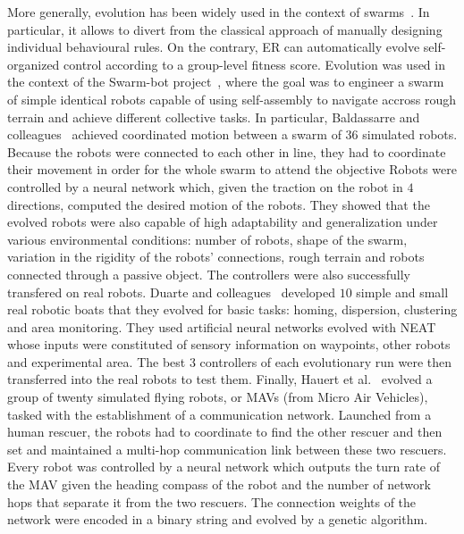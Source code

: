     More generally, evolution has been widely used in the context of swarms~\parencite{Brambilla2012, Fancesca2016}. In particular, it allows to divert from the classical approach of manually designing individual behavioural rules. On the contrary, ER can automatically evolve self-organized control according to a group-level fitness score. Evolution was used in the context of the Swarm-bot project~\parencite{Mondada2005}, where the goal was to engineer a swarm of simple identical robots capable of using self-assembly to navigate accross rough terrain and achieve different collective tasks. In particular, Baldassarre and colleagues~\parencite{Baldassarre2007} achieved coordinated motion  between a swarm of $36$ simulated robots. Because the robots were connected to each other in line, they had to coordinate their movement in order for the whole swarm to attend the objective Robots were controlled by a neural network which, given the traction on the robot in $4$ directions, computed the desired motion of the robots. They showed that the evolved robots were also capable of high adaptability and generalization under various environmental conditions: number of robots, shape of the swarm, variation in the rigidity of the robots' connections, rough terrain and robots connected through a passive object. The controllers were also successfully transfered on real robots. Duarte and colleagues~\parencite{Duarte2016} developed $10$ simple and small real robotic boats that they evolved for basic tasks: homing, dispersion, clustering and area monitoring. They used artificial neural networks evolved with NEAT~\parencite{Stanley2002} whose inputs were constituted of sensory information on waypoints, other robots and experimental area. The best $3$ controllers of each evolutionary run were then transferred into the real robots to test them. Finally, Hauert et al.~\parencite{Hauert2009} evolved a group of twenty simulated flying robots, or MAVs (from Micro Air Vehicles), tasked with the establishment of a communication network. Launched from a human rescuer, the robots had to coordinate to find the other rescuer and then set and maintained a multi-hop communication link between these two rescuers. Every robot was controlled by a neural network which outputs the turn rate of the MAV given the heading compass of the robot and the number of network hops that separate it from the two rescuers. The connection weights of the network were encoded in a binary string and evolved by a genetic algorithm.

